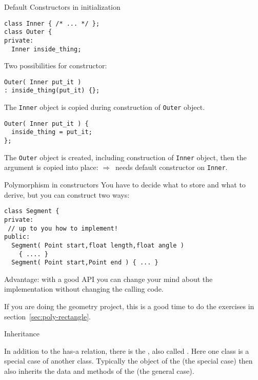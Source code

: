 \begin{block}{Default Constructors in initialization}
  \label{sl:member-init-def-construct}
\begin{lstlisting}
class Inner { /* ... */ };
class Outer {
private:
  Inner inside_thing;
\end{lstlisting}
Two possibilities for constructor:
\begin{multicols}{2}
\begin{lstlisting}
Outer( Inner put_it )
: inside_thing(put_it) {};
\end{lstlisting}
The \lstinline{Inner} object is copied during construction
of \lstinline{Outer} object.
\par\vfill\hbox{}

\columnbreak

\begin{lstlisting}
Outer( Inner put_it ) {
  inside_thing = put_it;
};
\end{lstlisting}
The \lstinline{Outer} object is created, including construction of
\lstinline{Inner} object, then the argument is copied into place:
$\Rightarrow$~needs default constructor on \lstinline{Inner}.

\end{multicols}
\end{block}

\begin{slide}{Polymorphism in constructors}
  \label{sl:obj-poly-construct}
  You have to decide what to store and what to derive, but you can
  construct two ways:
\begin{lstlisting}
class Segment {
private:
 // up to you how to implement!
public:
  Segment( Point start,float length,float angle )
    { .... }
  Segment( Point start,Point end ) { ... }
\end{lstlisting}
Advantage: with a good API you can change your mind about the
implementation without changing the calling code.
\end{slide}

\begin{exercise}
  If you are doing the geometry project, this is a good time to
  do the exercises in section~\ref{sec:poly-rectangle}.
\end{exercise}

 {Inheritance}
\label{sec:inheritance}

In addition to the has-a relation, there is the , also called . Here one class is
a special case of another class.
Typically the object of the  (the special
case) then also inherits the data and methods of the
 (the general case).

